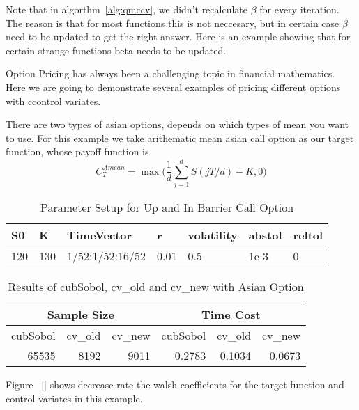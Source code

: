 
Note that in algorthm~\ref{alg:qmccv}, we didn't recalculate $\beta$ for every iteration. The reason is that for most functions this is not neccesary, but in certain case $\beta$ need to be updated to get the right answer. Here is an example showing that for certain strange functions beta needs to be updated. 


Option Pricing has always been a challenging topic in financial mathematics.
Here we are going to demonstrate several examples of pricing different options with ccontrol variates.


There are two types of asian options, depends on which types of mean you want to use. For this example we take arithematic mean asian call option as our target function, whose payoff function is
\[ C_{T}^{Amean} = \max\Big(\frac{1}{d}\sum_{j=1}^{d}S(jT/d)-K, 0\Big)\]

\begin{table}[h]
    \centering
	\begin{tabular}{lllllll}
		\hline\hline
        S0 & K & TimeVector & r & volatility & abstol & reltol \\[0.5ex]
        \hline
        120  & 130 & 1/52:1/52:16/52 & 0.01 & 0.5 & 1e-3 & 0\\[1ex] 
        \hline
	\end{tabular}
	\caption{Parameter Setup for Up and In Barrier Call Option}
\end{table}

\begin{table}[h]
    \centering
    \begin{tabular}{rrrrrr}  
    \hline\hline
	\multicolumn{3}{c}{Sample Size}
		&\multicolumn{3}{c}{Time Cost} \\
    \hline
	 cubSobol&cv\_old&cv\_new
    &cubSobol&cv\_old&cv\_new\\[0.5ex]
    \hline
		 65535&8192&9011
    &0.2783&0.1034&0.0673\\[1ex]
    \hline
	\end{tabular}
	\caption{Results of cubSobol, cv\_old and cv\_new with Asian Option}
\end{table}

Figure ~\ref{} shows decrease rate the walsh coefficients for the target function and control variates in this example.

